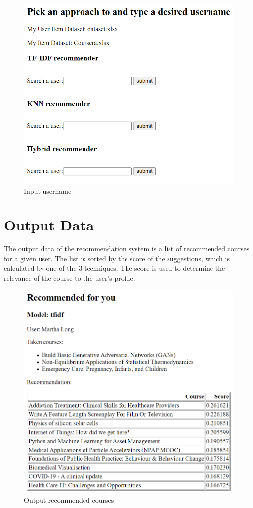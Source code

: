 \begin{figure}[H]
\center
\includegraphics[width=6in]{img/input.png}
\caption{Input username}
\end{figure}

\newpage
\section{Output Data}
The output data of the recommendation system is a list of recommended courses for a given user. 
The list is sorted by the score of the suggestions, which is calculated by one of the 3 techniques.
The score is used to determine the relevance of the course to the user's profile.
\begin{figure}[H]
\center
\includegraphics[width=6in]{img/output.png}
\caption{Output recommended courses}
\end{figure}

